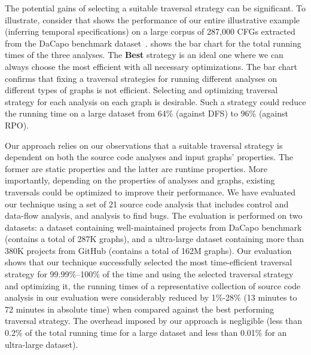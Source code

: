 The potential gains of selecting a suitable traversal strategy can be 
significant.
To illustrate, consider  that shows the performance of 
our entire illustrative example (inferring temporal specifications) on a 
large corpus of 287,000 CFGs extracted from the DaCapo
benchmark dataset~\cite{blackburn2006dacapo}.
 shows the 
bar chart for the total running times of the three analyses. The \textbf{Best}
 strategy is an ideal one where we can always choose the most efficient with 
all necessary optimizations. The bar chart confirms that fixing a traversal 
strategies for running different analyses on different types of graphs is not 
efficient. Selecting and optimizing traversal strategy for each analysis on 
each graph is desirable. Such a strategy could reduce the running time on a 
large dataset from 64\% (against DFS) to 96\% (against RPO).

Our approach relies on our observations that a suitable traversal strategy is
dependent on both the source code analyses and input graphs' properties.
The former are static properties and the latter are runtime properties.
More importantly, depending on the properties of analyses and graphs, existing
traversals could be optimized to improve their performance.  
We have evaluated our technique using a set of 21 source code analysis that
includes control and data-flow analysis, and analysis to find bugs. The
evaluation is performed on two datasets: a dataset containing well-maintained
projects from DaCapo benchmark (contains a total of 287K graphs), and a
ultra-large dataset containing more than 380K projects from GitHub (contains a
total of 162M graphs). Our evaluation shows that our technique successfully selected
the most time-efficient traversal strategy for 99.99\%--100\% of the time and
using the selected traversal strategy and optimizing it, the running times of a
representative collection of source code analysis in our evaluation
were considerably reduced by 1\%-28\% (13 minutes to 72 minutes in absolute time) when compared against the best performing traversal strategy.
The overhead imposed by our approach is negligible (less than 0.2\% of the total 
running time for a large dataset and less than 0.01\% for an ultra-large dataset). 

